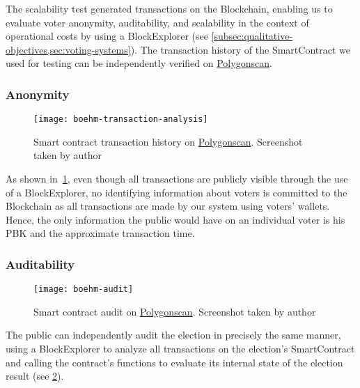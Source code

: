 The scalability test generated transactions on the \gls{Blockchain}, enabling us to evaluate voter anonymity, auditability, and scalability in the context of operational costs by using a \gls{BlockExplorer} (see \cref{subsec:qualitative-objectives,sec:voting-systems}).
The transaction history of the \gls{SmartContract} we used for testing can be independently verified on \href{https://mumbai.polygonscan.com/address/0x626aec8b9220bee641bc4098fa73f8cc55e50a8f}{Polygonscan}.

\subsubsection{Anonymity}

\begin{figure}[h]
    \centering
    \texttt{[image: boehm-transaction-analysis]}
    \caption[Smart contract transaction history]{Smart contract transaction history on \href{https://mumbai.polygonscan.com/address/0x626aec8b9220bee641bc4098fa73f8cc55e50a8f}{Polygonscan}. Screenshot taken by author}
    \label{fig:transaction-analysis}
\end{figure}

As shown in~\cref{fig:transaction-analysis}, even though all transactions are publicly visible through the use of a \gls{BlockExplorer}, no identifying information about voters is committed to the \gls{Blockchain} as all transactions are made by our system using voters' wallets.
Hence, the only information the public would have on an individual voter is his \gls{PBK} and the approximate transaction time.

\subsubsection{Auditability}

\begin{figure}[h]
    \centering
    \texttt{[image: boehm-audit]}
    \caption[Smart contract audit]{Smart contract audit on \href{https://mumbai.polygonscan.com/address/0x626aec8b9220bee641bc4098fa73f8cc55e50a8f}{Polygonscan}. Screenshot taken by author}
    \label{fig:audit}
\end{figure}

The public can independently audit the election in precisely the same manner, using a \gls{BlockExplorer} to analyze all transactions on the election’s \gls{SmartContract} and calling the contract’s functions to evaluate its internal state of the election result (see \cref{fig:audit}).

